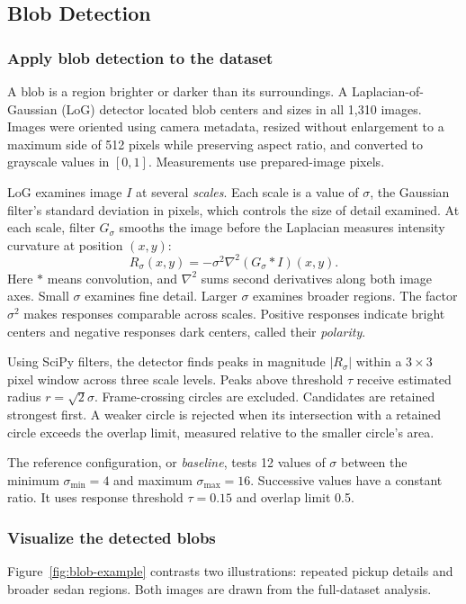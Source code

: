 \subsection{Blob Detection}
\label{sec:blob-detection}

\subsubsection{Apply blob detection to the dataset}
A blob is a region brighter or darker than its surroundings. A
Laplacian-of-Gaussian (LoG) detector located blob centers and sizes in all
1,310 images. Images were oriented using camera metadata, resized without
enlargement to a maximum side of 512 pixels while preserving aspect ratio,
and converted to grayscale values in $[0,1]$. Measurements use prepared-image pixels.

LoG examines image $I$ at several \emph{scales}. Each scale is a value of
$\sigma$, the Gaussian filter's standard deviation in pixels, which controls
the size of detail examined. At each scale, filter $G_\sigma$ smooths the image
before the Laplacian measures intensity curvature at position $(x,y)$:
\begin{equation}
 \boxed{R_\sigma(x,y)=-\sigma^2\nabla^2(G_\sigma*I)(x,y)}.
 \label{eq:blob-log}
\end{equation}
Here $*$ means convolution, and $\nabla^2$ sums second derivatives along
both image axes. Small $\sigma$ examines fine detail. Larger $\sigma$
examines broader regions.
The factor $\sigma^2$ makes responses comparable across scales. Positive
responses indicate bright centers and negative responses dark centers,
called their \emph{polarity}.

Using SciPy filters, the detector finds peaks in magnitude $|R_\sigma|$
within a $3\times3$ pixel window across three scale levels. Peaks above
threshold $\tau$ receive estimated radius $r=\sqrt{2}\sigma$.
Frame-crossing circles are excluded. Candidates are retained strongest first.
A weaker circle is rejected when its intersection with a retained circle
exceeds the overlap limit, measured relative to the smaller circle's area.

The reference configuration, or \emph{baseline}, tests 12 values of
$\sigma$ between the minimum $\sigma_{\min}=4$ and maximum
$\sigma_{\max}=16$. Successive values have a constant ratio.
It uses response threshold $\tau=0.15$ and overlap limit 0.5.

\subsubsection{Visualize the detected blobs}
Figure~\ref{fig:blob-example} contrasts two illustrations: repeated pickup
details and broader sedan regions. Both images are drawn from the full-dataset analysis.

